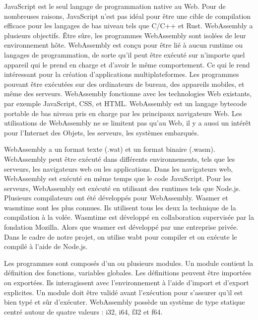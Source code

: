 \documentclass{rapportECL}
\begin{document}
JavaScript est le seul langage de programmation native au Web. 
Pour de nombreuses raisons, JavaScript n’est pas idéal pour être une cible de compilation efficace pour les langages de bas niveau tels que C/C++ et Rust. 
WebAssembly a plusieurs objectifs\cite{haas_bringing_2017}. Être sûre, les programmes WebAssembly sont isolées de leur environnement hôte. 
WebAssembly est conçu pour être lié à aucun runtime ou langages de programmation, de sorte qu'il peut être exécuté sur n'importe quel 
appareil qui le prend en charge et d’avoir le même comportement. 
Ce qui le rend intéressant pour la création d'applications multiplateformes.
Les programmes pouvant être exécutées sur des ordinateurs de bureau, des appareils mobiles, et même des serveurs. 
WebAssembly fonctionne avec les technologies Web existants, par exemple JavaScript, CSS, et HTML.
WebAssembly est un langage bytecode portable de bas niveau pris en charge par les principaux navigateurs Web. 
Les utilisations de WebAssembly ne se limitent pas qu'au Web, il y a aussi un intérêt pour l'Internet des Objets, les serveurs, les systèmes embarqués.
\par WebAssembly a un format texte (.wat) et un format binaire (.wasm). 
WebAssembly peut être exécuté dans différents environnements, tels que les serveurs, les navigateurs web ou les applications. 
Dans les navigateurs web, WebAssembly est exécuté en même temps que le code JavaScript. 
Pour les serveurs, WebAssembly est exécuté en utilisant des runtimes tels que Node.js. 
Plusieurs compilateurs ont été développés pour WebAssembly\cite{noauthor_wabt_2023,noauthor_wasm3_2023,noauthor_wasmer_nodate,noauthor_wasmtime_nodate}. 
Wasmer\cite{noauthor_wasmer_nodate} et wasmtime\cite{noauthor_wasmtime_nodate} sont les plus connues. 
Ils utilisent tous les deux la technique de la compilation à la volée. Wasmtime est développé en collaboration supervisée par la fondation Mozilla. 
Alors que wasmer est développé par une entreprise privée. 
Dans le cadre de notre projet, on utilise wabt\cite{noauthor_wabt_2023} pour compiler et on exécute le compilé à l’aide de Node.js\cite{noauthor_nodejs_nodate}. 
\par Les programmes sont composés d'un ou plusieurs modules. Un module contient la définition des fonctions, variables globales. 
Les définitions peuvent être importées ou exportées.
Ils interagissent avec l’environnement à l’aide d’import et d’export explicites. 
Un module doit être validé avant l’exécution pour s’assurer qu’il est bien typé et sûr d’exécuter. 
WebAssembly possède un système de type statique centré autour de quatre valeurs :  i32, i64, f32 et f64. 
\end{document}
